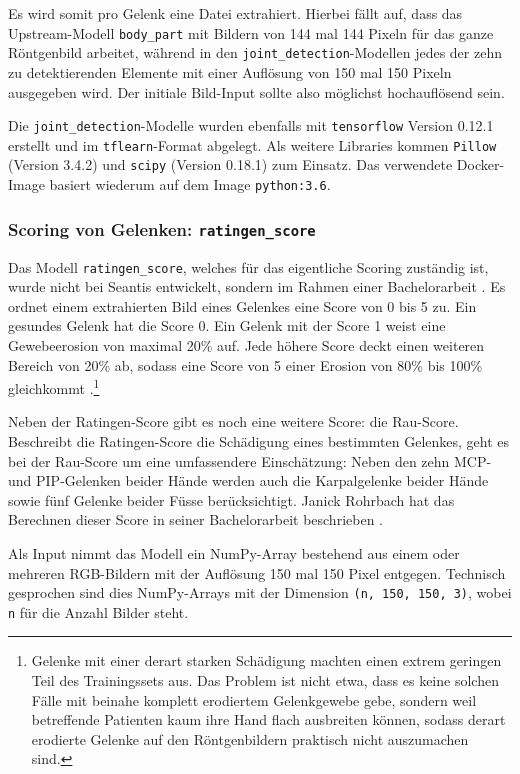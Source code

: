 Es wird somit pro Gelenk eine Datei extrahiert. Hierbei fällt auf, dass das Upstream-Modell \texttt{body\_part} mit Bildern von 144 mal 144 Pixeln für das ganze Röntgenbild arbeitet, während in den \texttt{joint\_detection}-Modellen jedes der zehn zu detektierenden Elemente mit einer Auflösung von 150 mal 150 Pixeln ausgegeben wird. Der initiale Bild-Input sollte also möglichst hochauflösend sein.

Die \texttt{joint\_detection}-Modelle wurden ebenfalls mit \texttt{tensorflow} Version 0.12.1 erstellt und im \texttt{tflearn}-Format abgelegt. Als weitere Libraries kommen \texttt{Pillow} (Version 3.4.2) und \texttt{scipy} (Version 0.18.1) zum Einsatz. Das verwendete Docker-Image basiert wiederum auf dem Image \texttt{python:3.6}.

\subsubsection{Scoring von Gelenken: \texttt{ratingen\_score}}
\label{sec:modell-ratingen-score}

Das Modell \texttt{ratingen\_score}, welches für das eigentliche Scoring zuständig ist, wurde nicht bei Seantis entwickelt, sondern im Rahmen einer Bachelorarbeit \cite{rohrbach2017}. Es ordnet einem extrahierten Bild eines Gelenkes eine Score von 0 bis 5 zu. Ein gesundes Gelenk hat die Score 0. Ein Gelenk mit der Score 1 weist eine Gewebeerosion von maximal 20\% auf. Jede höhere Score deckt einen weiteren Bereich von 20\% ab, sodass eine Score von 5 einer Erosion von 80\% bis 100\% gleichkommt \cite[S. 10]{rohrbach2017}.\footnote{Gelenke mit einer derart starken Schädigung machten einen extrem geringen Teil des Trainingssets aus. Das Problem ist nicht etwa, dass es keine solchen Fälle mit beinahe komplett erodiertem Gelenkgewebe gebe, sondern weil betreffende Patienten kaum ihre Hand flach ausbreiten können, sodass derart erodierte Gelenke auf den Röntgenbildern praktisch nicht auszumachen sind.}

Neben der Ratingen-Score gibt es noch eine weitere Score: die Rau-Score. Beschreibt die Ratingen-Score die Schädigung eines bestimmten Gelenkes, geht es bei der Rau-Score um eine umfassendere Einschätzung: Neben den zehn MCP- und PIP-Gelenken beider Hände werden auch die Karpalgelenke beider Hände sowie fünf Gelenke beider Füsse berücksichtigt. Janick Rohrbach hat das Berechnen dieser Score in seiner Bachelorarbeit beschrieben \cite[S. 10]{rohrbach2017}.

Als Input nimmt das Modell ein NumPy-Array bestehend aus einem oder mehreren RGB-Bildern mit der Auflösung 150 mal 150 Pixel entgegen. Technisch gesprochen sind dies NumPy-Arrays mit der Dimension \texttt{(n, 150, 150, 3)}, wobei \texttt{n} für die Anzahl Bilder steht.

